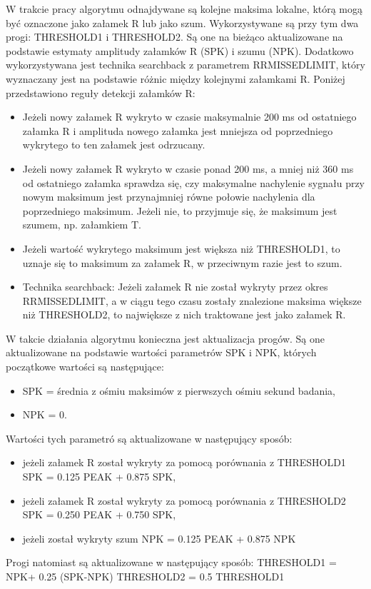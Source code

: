 \begin{enumerate}[I.]
W trakcie pracy algorytmu odnajdywane są kolejne maksima lokalne, którą mogą być oznaczone jako załamek R lub jako szum. Wykorzystywane są przy tym dwa progi: THRESHOLD1 i THRESHOLD2. Są one na bieżąco aktualizowane na podstawie estymaty amplitudy załamków R (SPK) i szumu (NPK). Dodatkowo wykorzystywana jest technika searchback z parametrem RRMISSEDLIMIT, który wyznaczany jest na podstawie różnic między kolejnymi załamkami R. Poniżej przedstawiono reguły detekcji załamków R:
\begin{itemize}
\item Jeżeli nowy załamek R wykryto w czasie maksymalnie 200 ms od ostatniego załamka R i amplituda nowego załamka jest mniejsza od poprzedniego wykrytego to ten załamek jest odrzucany.
\item Jeżeli nowy załamek R wykryto w czasie ponad 200 ms, a mniej niż 360 ms od ostatniego załamka sprawdza się, czy maksymalne nachylenie sygnału przy nowym maksimum jest przynajmniej równe połowie nachylenia dla poprzedniego maksimum. Jeżeli nie, to przyjmuje się, że maksimum jest szumem, np. załamkiem T.
\item Jeżeli wartość wykrytego maksimum jest większa niż THRESHOLD1, to uznaje się to maksimum za załamek R, w przeciwnym razie jest to szum.
\item Technika searchback: Jeżeli załamek R nie został wykryty przez okres RRMISSEDLIMIT, a w ciągu tego czasu zostały znalezione maksima większe niż THRESHOLD2, to największe z nich traktowane jest jako załamek R.
\end{itemize}
W takcie działania algorytmu konieczna jest aktualizacja progów. Są one aktualizowane na podstawie wartości parametrów SPK i NPK, których początkowe wartości są następujące:
\begin{itemize}
\item SPK = średnia z ośmiu maksimów z pierwszych ośmiu sekund badania,
\item NPK = 0.
\end{itemize}
Wartości tych parametró są aktualizowane w następujący sposób:
\begin{itemize}
\item jeżeli załamek R został wykryty za pomocą porównania z THRESHOLD1 
\newline
SPK = 0.125 PEAK + 0.875 SPK,
\item jeżeli załamek R został wykryty za pomocą porównania z THRESHOLD2 
\newline
SPK = 0.250 PEAK + 0.750 SPK,
\item jeżeli został wykryty szum
\newline
NPK = 0.125 PEAK + 0.875 NPK
\end{itemize}
Progi natomiast są aktualizowane w następujący sposób:
\newline
THRESHOLD1 = NPK+ 0.25 (SPK-NPK)
\newline
THRESHOLD2 = 0.5 THRESHOLD1


\end{enumerate}
